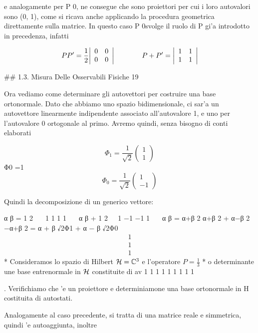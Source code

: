 {	e analogamente per P
	0, ne consegue che sono proiettori per cui i loro autovalori sono (0, 1), come si ricava anche applicando la procedura geometrica direttamente sulla matrice. In questo caso P
	0svolge il ruolo di P gi'a introdotto in precedenza, infatti
	
	$$P P^{\prime}={\frac{1}{2}}{\left|\begin{array}{l l}{0}&{0}\\ {0}&{0}\end{array}\right|}\qquad\qquad P+P^{\prime}={\left|\begin{array}{l l}{1}&{1}\\ {1}&{1}\end{array}\right|}$$
	
	## 1.3. Misura Delle Osservabili Fisiche 19
	
	Ora vediamo come determinare gli autovettori per costruire una base ortonormale. Dato che abbiamo uno spazio bidimensionale, ci sar'a un autovettore linearmente indipendente associato all'autovalore 1, e uno per l'autovalore 0 ortogonale al primo. Avremo quindi, senza bisogno di conti elaborati
	
	$$\Phi_{1}={\frac{1}{\sqrt{2}}}\left(\begin{array}{c}{{1}}\\ {{1}}\end{array}\right)$$
	Φ0 =1
	$$\Phi_{0}=\frac{1}{\sqrt{2}}\left(\begin{array}{c}{{1}}\\ {{-1}}\end{array}\right)$$
	
	Quindi la decomposizione di un generico vettore:
	
	α β = 1 2  1 1 1 1  α β + 1 2 1 −1 −1 1  α β =  α+β 2 α+β 2 +  α−β 2 −α+β 2 = α + β √2Φ1 + α − β √2Φ0
	$$\begin{array}{c}{{1}}\\ {{1}}\\ {{1}}\end{array}$$
	* Consideramos lo spazio di Hilbert ${\cal H}={\mathbb{C}}^{3}$ e l'operatore $P=\frac{1}{3}$ * o determinante une base entrenormale in ${\cal H}$ constituite di av
	1 1 1 1 1 1 1 1 1
	
	. Verifichiamo che 'e un proiettore e determiniamone una base ortonormale in H costituita di autostati.
	
	Analogamente al caso precedente, si tratta di una matrice reale e simmetrica, quindi 'e autoaggiunta, inoltre
	
}
